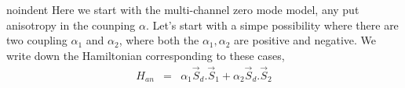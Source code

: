 \documentclass[reprint,prb,superscriptaddress]{revtex4-1}
\begin{document}
noindent Here we start with the multi-channel zero mode model, any put anisotropy in the counping $\alpha$. Let's start with a simpe possibility where there are two coupling $\alpha_1$ and $\alpha_2$, where both the $\alpha_1,\alpha_2$ are positive and negative. We write down the Hamiltonian corresponding to these cases,
\begin{eqnarray}
H_{an}&=& \alpha_1 \vec{S}_d.\vec{S}_1 + \alpha_2 \vec{S}_d.\vec{S}_2 %
\end{eqnarray}
%
%
%
%
\end{document}
